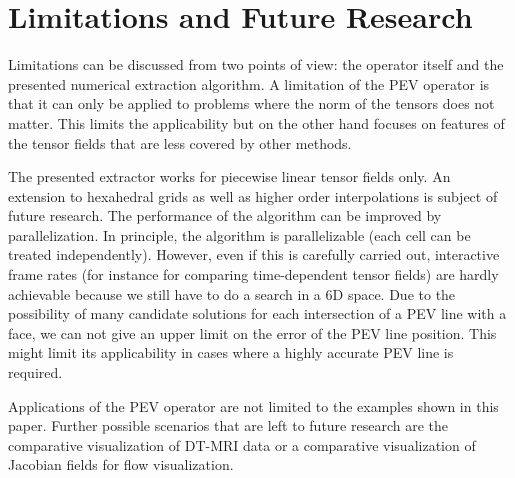 
%
\section{Limitations and Future Research} %
\label{sec:tcl_limitations}
% 
Limitations can be discussed from two points of view:
%
the operator itself and the presented numerical extraction algorithm.
%
A limitation of the PEV operator is that it can only be applied to problems
where the norm of the tensors does not matter.
%
This limits the applicability but on the other hand focuses on features of the
tensor fields that are less covered by other methods.
%

%
The presented extractor works for piecewise linear tensor fields only.
%
An extension to hexahedral grids as well as higher order interpolations is
subject of future research.
%
The performance of the algorithm can be improved by parallelization.
%
In principle, the algorithm is parallelizable (each cell can be treated
independently).
%
However, even if this is carefully carried out, interactive frame rates (for
instance for comparing time-dependent tensor fields) are hardly achievable
because we still have to do a search in a 6D space.
%
Due to the possibility of many candidate solutions for each intersection of a
PEV line with a face, we can not give an upper limit on the error of the
PEV line position.
%
This might limit its applicability in cases where a highly accurate PEV line is
required.
%

%
Applications of the PEV operator are not limited to the examples shown in this
paper.
%
Further possible scenarios that are left to future research are the comparative
visualization of DT-MRI data or a comparative visualization of Jacobian fields
for flow visualization.
%